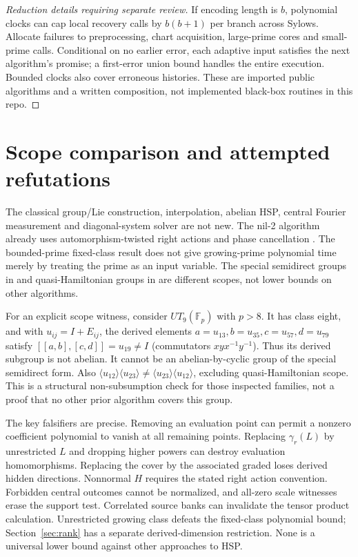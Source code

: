 \documentclass[11pt]{article}
\theoremstyle{remark}
\newcommand{\Fp}{\mathbb F_p}
\begin{document}
\begin{proof}[Reduction details requiring separate review]
If encoding length is $b$, polynomial clocks can cap local recovery calls
by $b(b+1)$ per branch across Sylows. Allocate failures to preprocessing,
chart acquisition, large-prime cores and small-prime calls. Conditional on
no earlier error, each adaptive input satisfies the next algorithm's
promise; a first-error union bound handles the entire execution. Bounded
clocks also cover erroneous histories. These are imported public algorithms
and a written composition, not implemented black-box routines in this repo.
\end{proof}

\section{Scope comparison and attempted refutations}
The classical group/Lie construction, interpolation, abelian HSP,
central Fourier measurement and diagonal-system solver are not new.
The nil-2 algorithm already uses automorphism-twisted right actions and
phase cancellation \cite{iss}. The bounded-prime fixed-class result
\cite{ii} does not give growing-prime polynomial time merely by treating
the prime as an input variable. The special semidirect groups in
\cite{is,morales} and quasi-Hamiltonian groups in \cite{morales} are
different scopes, not lower bounds on other algorithms.

For an explicit scope witness, consider $UT_9(\Fp)$ with $p>8$.
It has class eight, and with $u_{ij}=I+E_{ij}$, the derived elements
$a=u_{13},b=u_{35},c=u_{57},d=u_{79}$ satisfy
$[[a,b],[c,d]]=u_{19}\ne I$ (commutators $xyx^{-1}y^{-1}$).
Thus its derived subgroup is not abelian. It cannot be an abelian-by-cyclic
group of the special semidirect form. Also
$\langle u_{12}\rangle\langle u_{23}\rangle\ne
\langle u_{23}\rangle\langle u_{12}\rangle$, excluding quasi-Hamiltonian
scope. This is a structural non-subsumption check for those inspected
families, not a proof that no other prior algorithm covers this group.

The key falsifiers are precise. Removing an evaluation point can permit a
nonzero coefficient polynomial to vanish at all remaining points. Replacing
$\gamma_r(L)$ by unrestricted $L$ and dropping higher powers can destroy
evaluation homomorphisms. Replacing the cover by the associated graded
loses derived hidden directions. Nonnormal $H$ requires the stated right
action convention. Forbidden central outcomes cannot be normalized, and
all-zero scale witnesses erase the support test. Correlated source banks
can invalidate the tensor product calculation. Unrestricted growing class
defeats the fixed-class polynomial bound; Section~\ref{sec:rank} has a
separate derived-dimension restriction. None is a universal lower bound against other
approaches to HSP.
\end{document}

